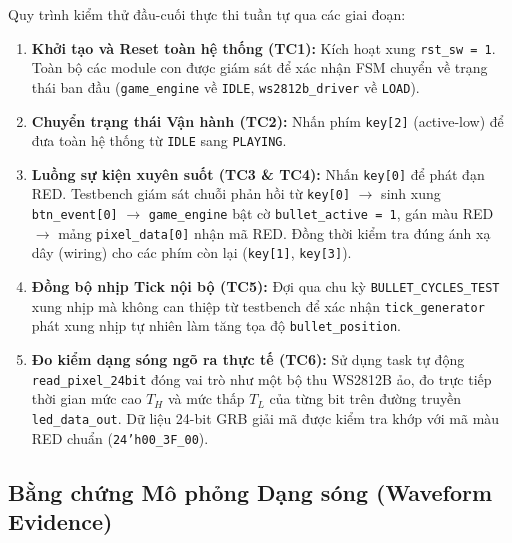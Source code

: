 \documentclass[12pt,a4paper]{article}
\begin{document}
Quy trình kiểm thử đầu-cuối thực thi tuần tự qua các giai đoạn:
\begin{enumerate}
    \item \textbf{Khởi tạo và Reset toàn hệ thống (TC1):} Kích hoạt xung \texttt{rst\_sw = 1}. Toàn bộ các module con được giám sát để xác nhận FSM chuyển về trạng thái ban đầu (\texttt{game\_engine} về \texttt{IDLE}, \texttt{ws2812b\_driver} về \texttt{LOAD}).
    \item \textbf{Chuyển trạng thái Vận hành (TC2):} Nhấn phím \texttt{key[2]} (active-low) để đưa toàn hệ thống từ \texttt{IDLE} sang \texttt{PLAYING}.
    \item \textbf{Luồng sự kiện xuyên suốt (TC3 \& TC4):} Nhấn \texttt{key[0]} để phát đạn RED. Testbench giám sát chuỗi phản hồi từ \texttt{key[0]} $\rightarrow$ sinh xung \texttt{btn\_event[0]} $\rightarrow$ \texttt{game\_engine} bật cờ \texttt{bullet\_active = 1}, gán màu RED $\rightarrow$ mảng \texttt{pixel\_data[0]} nhận mã RED. Đồng thời kiểm tra đúng ánh xạ dây (wiring) cho các phím còn lại (\texttt{key[1]}, \texttt{key[3]}).
    \item \textbf{Đồng bộ nhịp Tick nội bộ (TC5):} Đợi qua chu kỳ \texttt{BULLET\_CYCLES\_TEST} xung nhịp mà không can thiệp từ testbench để xác nhận \texttt{tick\_generator} phát xung nhịp tự nhiên làm tăng tọa độ \texttt{bullet\_position}.
    \item \textbf{Đo kiểm dạng sóng ngõ ra thực tế (TC6):} Sử dụng task tự động \texttt{read\_pixel\_24bit} đóng vai trò như một bộ thu WS2812B ảo, đo trực tiếp thời gian mức cao $T_H$ và mức thấp $T_L$ của từng bit trên đường truyền \texttt{led\_data\_out}. Dữ liệu 24-bit GRB giải mã được kiểm tra khớp với mã màu RED chuẩn (\texttt{24'h00\_3F\_00}).
\end{enumerate}

\subsection{Bằng chứng Mô phỏng Dạng sóng (Waveform Evidence)}
\end{document}
